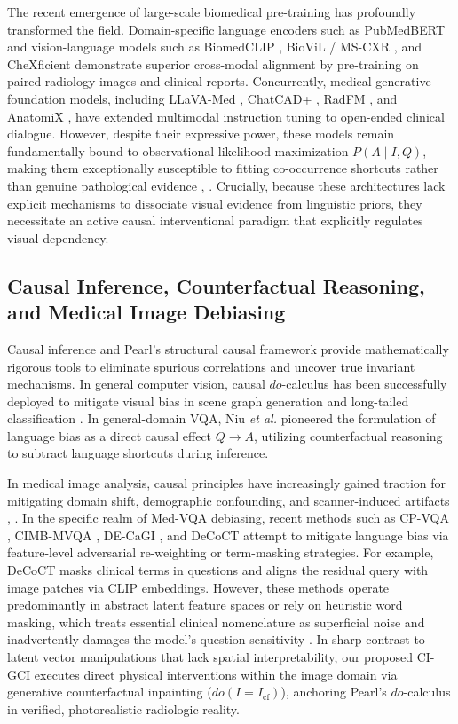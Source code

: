 \documentclass[journal,twoside,web]{ieeecolor}
\begin{document}
The recent emergence of large-scale biomedical pre-training has profoundly transformed the field. Domain-specific language encoders such as PubMedBERT \cite{gu2021} and vision-language models such as BiomedCLIP \cite{zhang2023}, BioViL / MS-CXR \cite{boecking2022}, and CheXficient \cite{wang2025chexficient} demonstrate superior cross-modal alignment by pre-training on paired radiology images and clinical reports. Concurrently, medical generative foundation models, including LLaVA-Med \cite{liu2023llavamed}, ChatCAD+ \cite{wang2024chatcadplus}, RadFM \cite{wu2024radfm}, and AnatomiX \cite{hashmi2025anatomix}, have extended multimodal instruction tuning to open-ended clinical dialogue. However, despite their expressive power, these models remain fundamentally bound to observational likelihood maximization $P(A \mid I, Q)$, making them exceptionally susceptible to fitting co-occurrence shortcuts rather than genuine pathological evidence \cite{zhu2025medbiasx}, \cite{wang2024mmql}. Crucially, because these architectures lack explicit mechanisms to dissociate visual evidence from linguistic priors, they necessitate an active causal interventional paradigm that explicitly regulates visual dependency.

\subsection{Causal Inference, Counterfactual Reasoning, and Medical Image Debiasing}
Causal inference and Pearl's structural causal framework \cite{pearl2009} provide mathematically rigorous tools to eliminate spurious correlations and uncover true invariant mechanisms. In general computer vision, causal $do$-calculus has been successfully deployed to mitigate visual bias in scene graph generation \cite{tang2020} and long-tailed classification \cite{zhangc2021}. In general-domain VQA, Niu \textit{et al.} \cite{niu2021cfvqa} pioneered the formulation of language bias as a direct causal effect $Q \rightarrow A$, utilizing counterfactual reasoning to subtract language shortcuts during inference.

In medical image analysis, causal principles have increasingly gained traction for mitigating domain shift, demographic confounding, and scanner-induced artifacts \cite{sanchez2024diffscm}, \cite{mansilla2022}. In the specific realm of Med-VQA debiasing, recent methods such as CP-VQA \cite{lili2022}, CIMB-MVQA \cite{liu2025cimb}, DE-CaGI \cite{liu2025decagi}, and DeCoCT \cite{wan2025decoct} attempt to mitigate language bias via feature-level adversarial re-weighting or term-masking strategies. For example, DeCoCT masks clinical terms in questions and aligns the residual query with image patches via CLIP embeddings. However, these methods operate predominantly in abstract latent feature spaces or rely on heuristic word masking, which treats essential clinical nomenclature as superficial noise and inadvertently damages the model's question sensitivity \cite{wan2025decoct}. In sharp contrast to latent vector manipulations that lack spatial interpretability, our proposed CI-GCI executes direct physical interventions within the image domain via generative counterfactual inpainting ($do(I = I_{\text{cf}})$), anchoring Pearl's $do$-calculus in verified, photorealistic radiologic reality.
\end{document}
